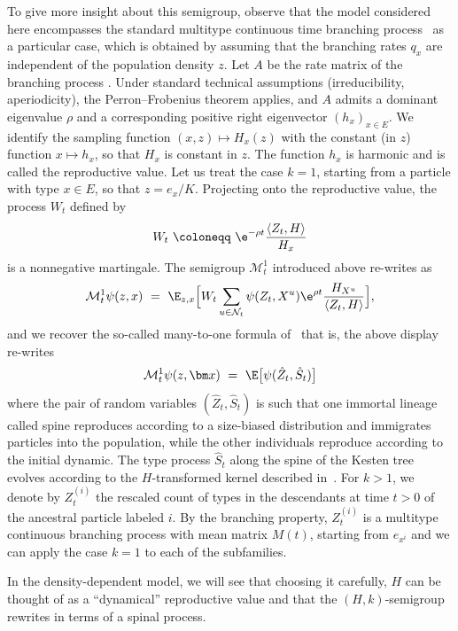 \begin{refsegment}
\begin{rem}
To give more insight about this semigroup, observe that the model considered here encompasses the standard multitype continuous time branching process~\cite{athreya_branching_1972}  as a particular case, which is obtained by assuming that the branching rates $q_{x}$ are independent of the population density $z$. 
Let $A$ be the rate matrix of the branching process  \citep{athreya_branching_1972}. Under standard technical assumptions (irreducibility, aperiodicity), the Perron--Frobenius theorem applies, and $A$ admits a dominant eigenvalue $\rho$ and a corresponding positive right eigenvector $(h_{x})_{x\in E}$. We identify the sampling function $(x,z)\mapsto H_{x}(z)$ with the constant (in $z$) function $x\mapsto h_{x}$, so that 
$H_{x}$ is constant in $z$.
 The function $h_x$ is  harmonic and is called the reproductive value. Let us treat the case $k=1$, starting from a particle with type $x\in E$, so that $z=e_x/K$. Projecting onto the reproductive value, the process $W_t$ defined by
\[
W_t \ \coloneqq\ \e^{-\rho t} \frac{\langle Z_t,H\rangle}{H_{x}}
\]
is a nonnegative martingale.
The semigroup $\mathcal{M}^1_t$ introduced above re-writes as 
\[
\mathcal{M}^1_t\psi(z,x)\ =\  \E_{z,x}\Big[W_t \sum_{u\in \mathcal{N}_t}\psi(Z_t, X^u)\e^{\rho t}\frac{ H_{X^u}}{\langle Z_t, H\rangle }\Big]
, \]
and  we recover the so-called many-to-one formula of~\cite{kurtz_conceptual_1997} that is, the above display re-writes
\[ 
\mathcal{M}^1_t\psi(z,\bm x)\ =\  \E\big[\psi(\hat Z_t,\hat S_t)\big]
\]
where the pair of random variables $(\hat{Z}_t,  \hat S_t)$ is such that one immortal lineage called spine reproduces according to a size-biased distribution and immigrates particles into the population, while the other individuals reproduce according to the initial dynamic. The type process $\hat S_t$ along the spine of the Kesten tree evolves according to the $H$-transformed kernel described \eg in~\cite{lyons_pemantle_peres_1995}.
For $k>1$, we denote by $Z_t^{(i)}$ the rescaled count of types in the descendants at time $t>0$ of the ancestral particle labeled $i$. By the branching property, $Z_t^{(i)}$ is a multitype continuous branching process with mean matrix $M(t)$, starting from $e_{x^i}$ and we can apply the case $k=1$ to each of the subfamilies. 

In the density-dependent model, we will see that choosing it carefully, $H$ can be thought of as a ``dynamical'' reproductive value and that the $(H,k)$-semigroup rewrites in terms of a spinal process.
\end{rem}


\end{refsegment}
